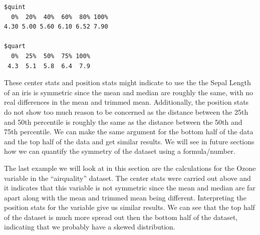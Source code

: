 \documentclass[
  letterpaper,
  DIV=11,
  numbers=noendperiod]{scrreprt}
\newenvironment{Shaded}{\begin{snugshade}}{\end{snugshade}}
\newcommand{\AttributeTok}[1]{\textcolor[rgb]{0.40,0.45,0.13}{#1}}
\newcommand{\ConstantTok}[1]{\textcolor[rgb]{0.56,0.35,0.01}{#1}}
\newcommand{\ControlFlowTok}[1]{\textcolor[rgb]{0.00,0.23,0.31}{\textbf{#1}}}
\newcommand{\DecValTok}[1]{\textcolor[rgb]{0.68,0.00,0.00}{#1}}
\newcommand{\FunctionTok}[1]{\textcolor[rgb]{0.28,0.35,0.67}{#1}}
\newcommand{\NormalTok}[1]{\textcolor[rgb]{0.00,0.23,0.31}{#1}}
\newcommand{\OtherTok}[1]{\textcolor[rgb]{0.00,0.23,0.31}{#1}}
\newcommand{\SpecialCharTok}[1]{\textcolor[rgb]{0.37,0.37,0.37}{#1}}
\begin{document}
\begin{Shaded}
\end{Shaded}

\begin{verbatim}
$quint
  0%  20%  40%  60%  80% 100% 
4.30 5.00 5.60 6.10 6.52 7.90 

$quart
  0%  25%  50%  75% 100% 
 4.3  5.1  5.8  6.4  7.9 
\end{verbatim}

These center stats and position stats might indicate to use the the
Sepal Length of an iris is symmetric since the mean and median are
roughly the same, with no real differences in the mean and trimmed mean.
Additionally, the position stats do not show too much reason to be
concerned as the distance between the 25th and 50th percentile is
roughly the same as the distance between the 50th and 75th percentile.
We can make the same argument for the bottom half of the data and the
top half of the data and get similar results. We will see in future
sections how we can quantify the symmetry of the dataset using a
formula/number.

The last example we will look at in this section are the calculations
for the Ozone variable in the ``airquality'' dataset. The center stats
were carried out above and it indicates that this variable is not
symmetric since the mean and median are far apart along with the mean
and trimmed mean being different. Interpreting the position stats for
the variable give us similar results. We can see that the top half of
the dataset is much more spread out then the bottom half of the dataset,
indicating that we probably have a skewed distribution.

\begin{Shaded}
\end{Shaded}
\end{document}
